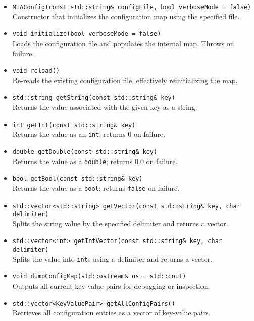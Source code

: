 \begin{itemize}
	\item \texttt{MIAConfig(const std::string\& configFile, bool verboseMode = false)}\\
	Constructor that initializes the configuration map using the specified file.
	
	\item \texttt{void initialize(bool verboseMode = false)}\\
	Loads the configuration file and populates the internal map. Throws on failure.
	
	\item \texttt{void reload()}\\
	Re-reads the existing configuration file, effectively reinitializing the map.
	
	\item \texttt{std::string getString(const std::string\& key)}\\
	Returns the value associated with the given key as a string.
	
	\item \texttt{int getInt(const std::string\& key)}\\
	Returns the value as an \texttt{int}; returns 0 on failure.
	
	\item \texttt{double getDouble(const std::string\& key)}\\
	Returns the value as a \texttt{double}; returns 0.0 on failure.
	
	\item \texttt{bool getBool(const std::string\& key)}\\
	Returns the value as a \texttt{bool}; returns \texttt{false} on failure.
	
	\item \texttt{std::vector<std::string> getVector(const std::string\& key, char delimiter)}\\
	Splits the string value by the specified delimiter and returns a vector.
	
	\item \texttt{std::vector<int> getIntVector(const std::string\& key, char delimiter)}\\
	Splits the value into \texttt{int}s using a delimiter and returns a vector.
	
	\item \texttt{void dumpConfigMap(std::ostream\& os = std::cout)}\\
	Outputs all current key-value pairs for debugging or inspection.
	
	\item \texttt{std::vector<KeyValuePair> getAllConfigPairs()}\\
	Retrieves all configuration entries as a vector of key-value pairs.
\end{itemize}

